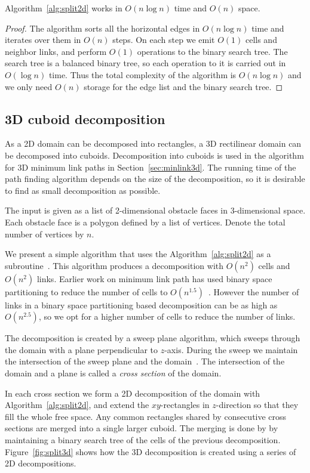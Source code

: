 \documentclass[english,gradu]{tktltiki2018}
\begin{document}
\begin{lem}\label{lem:split2dtime}Algorithm~\ref{alg:split2d} works in $O(n\log n)$ time and $O(n)$ space.\end{lem}
\begin{proof}
The algorithm sorts all the horizontal edges in $O(n\log n)$ time and iterates over them in $O(n)$ steps.
On each step we emit $O(1)$ cells and neighbor links, and perform $O(1)$ operations to the binary search tree.
The search tree is a balanced binary tree, so each operation to it is carried out in $O(\log n)$ time.
Thus the total complexity of the algorithm is $O(n\log n)$ and we only need $O(n)$ storage for the edge list and the binary search tree.
\end{proof}

\subsection{3D cuboid decomposition}\label{sec:split3d}

As a 2D domain can be decomposed into rectangles, a 3D rectilinear domain can be decomposed into cuboids.
Decomposition into cuboids is used in the algorithm for 3D minimum link paths in Section~\ref{sec:minlink3d}.
The running time of the path finding algorithm depends on the size of the decomposition, so it is desirable to find as small decomposition as possible.

The input is given as a list of 2-dimensional obstacle faces in 3-dimensional space.
Each obstacle face is a polygon defined by a list of vertices.
Denote the total number of vertices by $n$.

We present a simple algorithm that uses the Algorithm~\ref{alg:split2d} as a subroutine~\cite{revisited}.
This algorithm produces a decomposition with $O(n^2)$ cells and $O(n^2)$ links.
Earlier work on minimum link path has used binary space partitioning to reduce the number of cells to $O(n^{1.5})$~\cite{wagner,bsp}.
However the number of links in a binary space partitioning based decomposition can be as high as $O(n^{2.5})$, so we opt for a higher number of cells to reduce the number of links.

The decomposition is created by a sweep plane algorithm, which sweeps through the domain with a plane perpendicular to $z$-axis.
During the sweep we maintain the intersection of the sweep plane and the domain~\fspace.
The intersection of the domain and a plane is called a \emph{cross section} of the domain.

In each cross section we form a 2D decomposition of the domain with Algorithm~\ref{alg:split2d}, and extend the $xy$-rectangles in $z$-direction so that they fill the whole free space.
Any common rectangles shared by consecutive cross sections are merged into a single larger cuboid.
The merging is done by by maintaining a binary search tree of the cells of the previous decomposition.
Figure~\ref{fig:split3d} shows how the 3D decomposition is created using a series of 2D decompositions.
\end{document}
